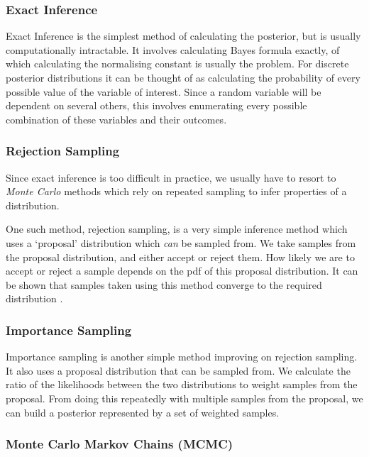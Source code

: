 \documentclass[sigconf]{acmart}
\begin{document}
\subsubsection{Exact Inference}

Exact Inference is the simplest method of calculating the posterior, but is usually computationally intractable. It involves calculating Bayes formula exactly, of which calculating the normalising constant is usually the problem. For discrete posterior distributions it can be thought of as calculating the probability of every possible value of the variable of interest. Since a random variable will be dependent on several others, this involves enumerating every possible combination of these variables and their outcomes.

\subsubsection{Rejection Sampling}

Since exact inference is too difficult in practice, we usually have to resort to \textit{Monte Carlo} \cite{monte-carlo} methods which rely on repeated sampling to infer properties of a distribution.

One such method, rejection sampling, is a very simple inference method which uses a `proposal' distribution which \textit{can} be sampled from. We take samples from the proposal distribution, and either accept or reject them. How likely we are to accept or reject a sample depends on the pdf of this proposal distribution. It can be shown that samples taken using this method converge to the required distribution \cite{flury1990acceptance}.

\subsubsection{Importance Sampling}

Importance sampling is another simple method improving on rejection sampling. It also uses a proposal distribution that can be sampled from. We calculate the ratio of the likelihoods between the two distributions to weight samples from the proposal. From doing this repeatedly with multiple samples from the proposal, we can build a posterior represented by a set of weighted samples.

\subsubsection{Monte Carlo Markov Chains (MCMC)}
\end{document}
